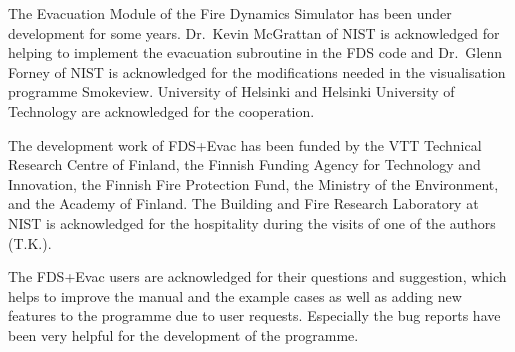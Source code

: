 \documentclass[12pt,a4paper,final,twoside]{stylevk}
\begin{document}
\noindent The Evacuation Module of the Fire Dynamics Simulator has
been under development for some years.  Dr.\ Kevin McGrattan of NIST
is acknowledged for helping to implement the evacuation subroutine in
the FDS code and Dr.\ Glenn Forney of NIST is acknowledged for the
modifications needed in the visualisation programme Smokeview.
University of Helsinki and Helsinki University of Technology are
acknowledged for the cooperation.

The development work of FDS+Evac has been funded by the VTT Technical
Research Centre of Finland, the Finnish Funding Agency for Technology
and Innovation, the Finnish Fire Protection Fund, the Ministry of the
Environment, and the Academy of Finland.  The Building and Fire
Research Laboratory at NIST is acknowledged for the hospitality during
the visits of one of the authors (T.K.).

The FDS+Evac users are acknowledged for their questions and
suggestion, which helps to improve the manual and the example cases as
well as adding new features to the programme due to user requests.
Especially the bug reports have been very helpful for the development
of the programme.

\clearpage

\newpage
\end{document}
